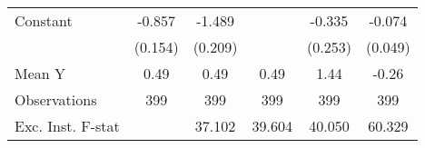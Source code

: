 {\begin{tabular}{l*{5}{c}}
\addlinespace
Constant            &      -0.857\sym{***}&      -1.489\sym{***}&                     &      -0.335         &      -0.074         \\
                    &     (0.154)         &     (0.209)         &                     &     (0.253)         &     (0.049)         \\
\midrule
Mean Y              &        0.49         &        0.49         &        0.49         &        1.44         &       -0.26         \\
Observations        &         399         &         399         &         399         &         399         &         399         \\
Exc. Inst. F-stat   &                     &      37.102         &      39.604         &      40.050         &      60.329         \\
\bottomrule
\end{tabular}
}
